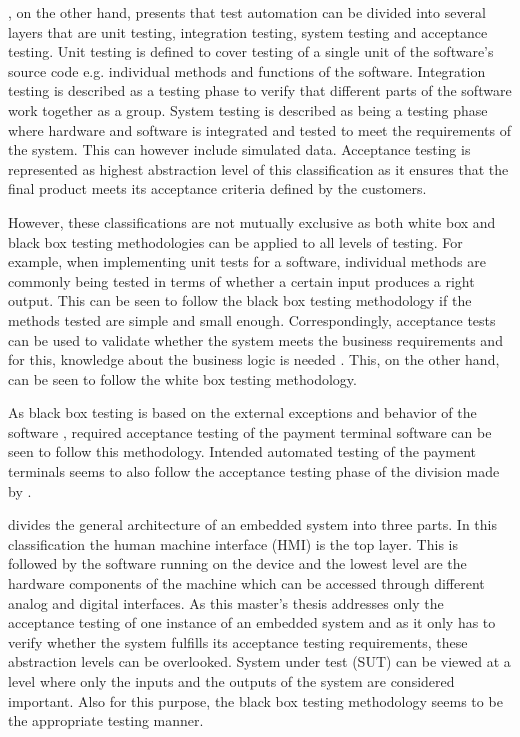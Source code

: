 \cite{huizinga2007automated}, on the other hand, presents that test automation can be divided into several layers that are unit testing, integration testing, system testing and acceptance testing. Unit testing is defined to cover testing of a single unit of the software's source code e.g. individual methods and functions of the software. Integration testing is described as a testing phase to verify that different parts of the software work together as a group. System testing is described as being a testing phase where hardware and software is integrated and tested to meet the requirements of the system. This can however include simulated data. Acceptance testing is represented as highest abstraction level of this classification as it ensures that the final product meets its acceptance criteria defined by the customers.

However, these classifications are not mutually exclusive as both white box and black box testing methodologies can be applied to all levels of testing. For example, when implementing unit tests for a software, individual methods are commonly being tested in terms of whether a certain input produces a right output. This can be seen to follow the black box testing methodology if the methods tested are simple and small enough. Correspondingly, acceptance tests can be used to validate whether the system meets the business requirements and for this, knowledge about the business logic is needed \citep{haugset2008automated}. This, on the other hand, can be seen to follow the white box testing methodology.

As black box testing is based on the external exceptions and behavior of the software \citep{khan2012comparative}, required acceptance testing of the payment terminal software can be seen to follow this methodology. Intended automated testing of the payment terminals seems to also follow the acceptance testing phase of the division made by \cite{khan2012comparative}.

\cite{Ramler} divides the general architecture of an embedded system into three parts. In this classification the human machine interface (HMI) is the top layer. This is followed by the software running on the device and the lowest level are the hardware components of the machine which can be accessed through different analog and digital interfaces. As this master's thesis addresses only the acceptance testing of one instance of an embedded system and as it only has to verify whether the system fulfills its acceptance testing requirements, these abstraction levels can be overlooked. System under test (SUT) can be viewed at a level where only the inputs and the outputs of the system are considered important. Also for this purpose, the black box testing methodology seems to be the appropriate testing manner.

